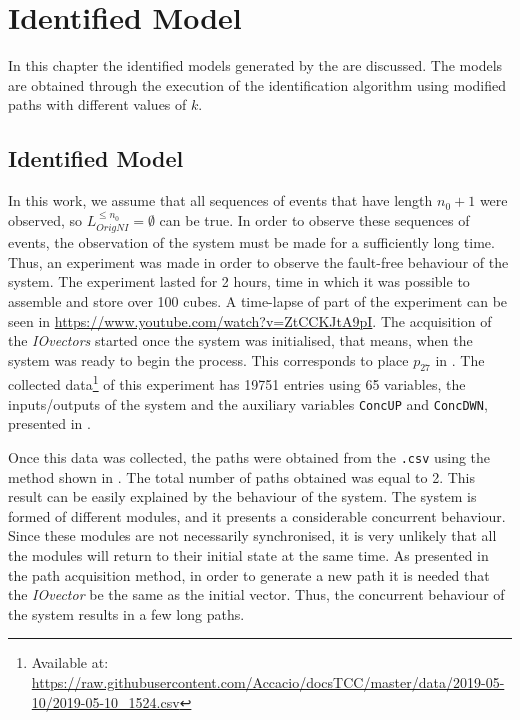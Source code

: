 \chapter{Identified Model}
\label{cha:results}
In this chapter the identified models generated by the
 are discussed. The models are obtained through the
execution of the identification algorithm using modified paths with different
values of $k$.

\section{Identified Model}
In this work, we assume that all
sequences of events that have length $n_0+1$ were observed, so 
$L_{OrigNI}^{\leq n_0}=\emptyset$ can be true. In order to observe these
sequences of events, the observation of the system must be made for a sufficiently
long time. Thus, an experiment was made in order to observe the fault-free
behaviour of the system. The experiment lasted for 2
hours, time in which it was possible to assemble and store over 100 cubes. A time-lapse of part of the experiment can be seen in
\url{https://www.youtube.com/watch?v=ZtCCKJtA9pI}.
The acquisition of the \emph{IOvectors} started once the system was initialised, that means,
when the system was ready to begin the process. This corresponds to place
\hyperlink{partialTable:p27}{$p_{27}$} in .
The collected data\footnote{Available at:
  \url{https://raw.githubusercontent.com/Accacio/docsTCC/master/data/2019-05-10/2019-05-10_1524.csv}}
of this experiment has 19751 entries using 65
variables, the inputs\slash outputs of the system and the auxiliary variables
\verb|ConcUP| and \verb|ConcDWN|, presented in .

Once this data was collected, the paths were obtained from the \verb|.csv| using
the method shown in . The total number of paths obtained was equal to
2. This result can be easily explained by the behaviour of the system. The
system is formed of different modules, and it presents a considerable concurrent behaviour. Since these modules are not necessarily
synchronised, it is very unlikely that all the modules will return to their initial
state at the same time. As presented in the path acquisition method, in order to generate
a new path it is needed that the \emph{IOvector} be the same as the initial
vector. Thus, the concurrent behaviour of the system results in a few long paths. 


